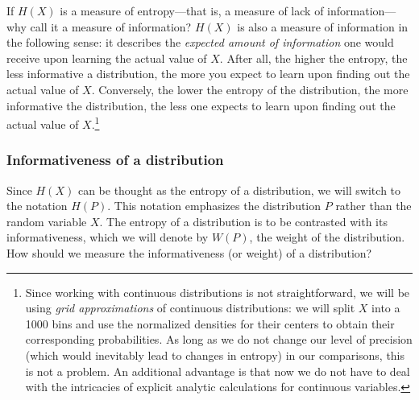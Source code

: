 \documentclass[
  10pt,
  dvipsnames,enabledeprecatedfontcommands]{scrartcl}
\begin{document}
If \(H(X)\) is a measure of entropy---that is, a measure of lack of
information---why call it a measure of information? \(H(X)\) is also a
measure of information in the following sense: it describes the
\textit{expected amount of information} one would receive upon learning
the actual value of \(X\). After all, the higher the entropy, the less
informative a distribution, the more you expect to learn upon finding
out the actual value of \(X\). Conversely, the lower the entropy of the
distribution, the more informative the distribution, the less one
expects to learn upon finding out the actual value of \(X\).\footnote{Since
  working with continuous distributions is not straightforward, we will
  be using \emph{grid approximations} of continuous distributions: we
  will split \(X\) into a 1000 bins and use the normalized densities for
  their centers to obtain their corresponding probabilities. As long as
  we do not change our level of precision (which would inevitably lead
  to changes in entropy) in our comparisons, this is not a problem. An
  additional advantage is that now we do not have to deal with the
  intricacies of explicit analytic calculations for continuous
  variables.}

\hypertarget{informativeness-of-a-distribution}{%
\subsubsection{Informativeness of a
distribution}\label{informativeness-of-a-distribution}}

Since \(H(X)\) can be thought as the entropy of a distribution, we will
switch to the notation \(H(P)\). This notation emphasizes the
distribution \(P\) rather than the random variable \(X\). The entropy of
a distribution is to be contrasted with its informativeness, which we
will denote by \(W(P)\), the weight of the distribution. How should we
measure the informativeness (or weight) of a distribution?
\end{document}
